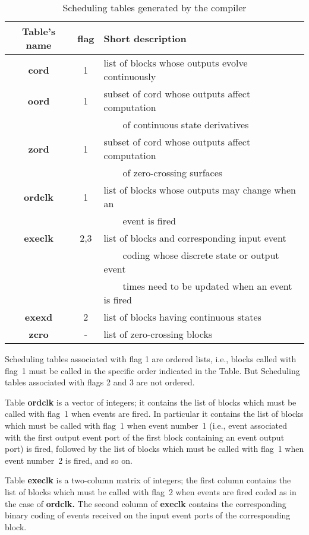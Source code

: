 \documentclass{book}
\begin{document}
\begin{table}[ht]
\begin{center}
\begin{tabular}{|c|c|l|} \hline
Table's name&flag&Short description\\
\hline
{\bf cord} & 1 & list of blocks whose outputs evolve continuously \\
{\bf oord} & 1 & subset of cord whose outputs affect computation \\
&&         ~~~~of continuous state derivatives \\
{\bf zord} & 1 & subset of cord whose outputs affect computation \\
&&         ~~~~of zero-crossing surfaces \\
{\bf ordclk} & 1 &  list of blocks whose outputs may change when an \\
&&         ~~~~event is fired \\
{\bf execlk} & 2,3 & list of blocks and corresponding input event\\
&&         ~~~~coding whose discrete state or output event \\
&&         ~~~~times need to be updated when an event is fired \\
{\bf exexd} & 2 & list of blocks having continuous states \\ 
{\bf zcro} & -  & list of zero-crossing blocks \\  \hline
\end{tabular}
\end{center}
\caption{Scheduling tables generated by the compiler}
\label{comp1}
\end{table}

Scheduling tables associated with flag 1 are ordered lists, i.e.,
blocks called with flag~1 must be called in the specific order
indicated in the Table. But 
Scheduling tables associated with flags 2 and 3 are not ordered.

Table {\bf ordclk} is a vector of integers; it contains the list of
blocks which must be called with flag~1 when events are fired. 
In particular it contains the list of blocks which must be called
with flag~1 when event number~1 (i.e., event associated with the first
output event port of the first block containing an event output
port) is fired, followed by the list of blocks which must be called
with flag~1 when event number~2 is fired, and so on. 

Table {\bf execlk} is a two-column matrix of integers; the first column
contains the list of blocks which must be called
with flag~2 when events are fired coded as in the case of {\bf ordclk.} 
The second column of {\bf execlk} contains the corresponding binary coding of
events received on the input event ports of the corresponding block.
\end{document}
